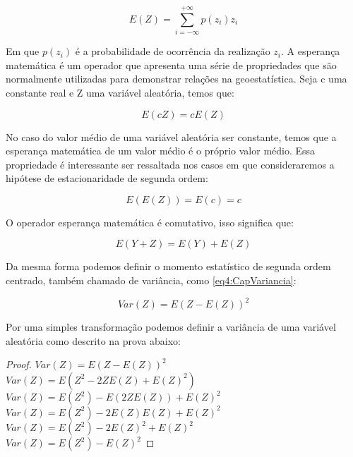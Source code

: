 \begin{equation}\label{eq2:Valor_esperado_discreto}
	E\left(Z\right)= \sum_{i=-\infty}^{+\infty}p\left(z_i\right)z_i
\end{equation}

Em que $p\left(z_i\right)$ é a probabilidade de ocorrência da realização $z_i$. A esperança matemática é um operador que apresenta uma série de propriedades que são normalmente utilizadas para demonstrar relações na geoestatística. Seja c uma constante real e Z uma variável aleatória, temos que:

\begin{equation}\label{eq3:Propesperancamatematica}
E\left(cZ\right)= cE\left(Z\right)
\end{equation}

No caso do valor médio de uma variável aleatória ser constante, temos que a esperança matemática de um valor médio é o próprio valor médio. Essa propriedade é interessante ser ressaltada nos casos em que consideraremos a hipótese de estacionaridade de segunda ordem: 

\begin{equation}\label{eq4:Propesperancamatematica2}
E\left( E(Z) \right)= E(c) = c
\end{equation}

O operador esperança matemática é comutativo, isso significa que:

\begin{equation}\label{eq5:Propesperancamatematica3}
E\left( Y +  Z\right)= E(Y) + E(Z)
\end{equation}

Da mesma forma podemos definir o momento estatístico de segunda ordem centrado, também chamado de variância, como \eqref{eq4:CapVariancia}:

\begin{equation}\label{eq4:CapVariancia}
Var\left(Z\right)= E\left( Z - E\left( Z\right) \right)^2
\end{equation} 

Por uma simples transformação podemos definir a variância de uma variável aleatória como descrito na prova abaixo:

\begin{proof} 	 
$Var\left( Z \right)= E\left( Z -E(Z) \right)^2$  \\
$Var\left(Z \right)= E\left( Z^2 -2ZE\left( Z\right)+ E(Z)^2 \right)$ \\
$Var\left(Z \right)= E(Z^2) -E(2ZE(Z)) +E(Z)^2$  \\
$Var\left(Z \right)= E(Z^2) -2E(Z)E(Z) +E(Z)^2$  \\
$Var\left(Z \right)= E(Z^2) -2E(Z)^2 +E(Z)^2$ \\
$Var\left(Z \right)= E(Z^2) - E(Z)^2$
\end{proof}

